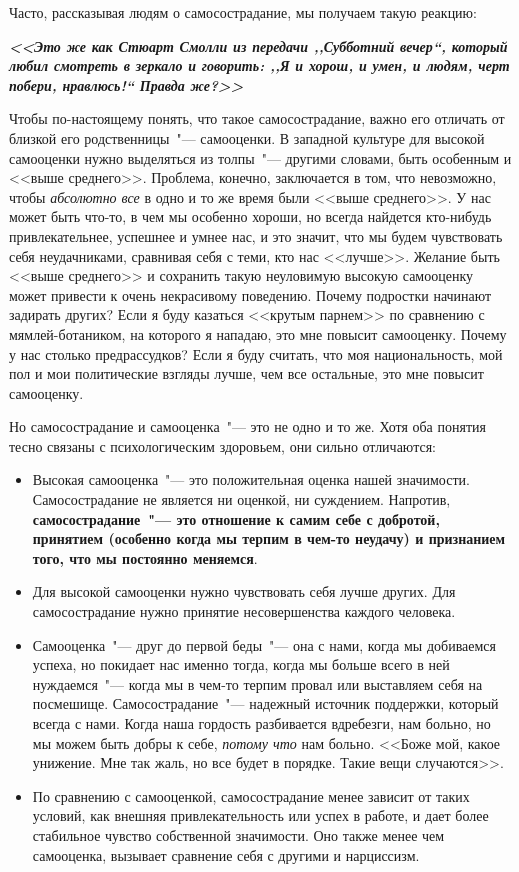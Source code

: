 Часто, рассказывая людям о самосострадание, мы получаем такую реакцию:

\textbf{\textit{<<Это же как Стюарт Смолли из передачи ,,Субботний вечер``, который любил смотреть в зеркало и говорить: ,,Я и хорош, и умен, и людям, черт побери, нравлюсь!`` Правда же?>> }}

\vspace{2ex}

Чтобы по-настоящему понять, что такое самосострадание, важно его отличать от близкой его родственницы~"--- самооценки. В западной культуре для высокой самооценки нужно выделяться из толпы~"--- другими словами, быть особенным и <<выше среднего>>. Проблема, конечно, заключается в том, что невозможно, чтобы \emph{абсолютно все} в одно и то же время были <<выше среднего>>. У нас может быть что-то, в чем мы особенно хороши, но всегда найдется кто-нибудь привлекательнее, успешнее и умнее нас, и это значит, что мы будем чувствовать себя неудачниками, сравнивая себя с теми, кто нас <<лучше>>. Желание быть <<выше среднего>> и сохранить такую неуловимую высокую самооценку может привести к очень некрасивому поведению. Почему подростки начинают  задирать других? Если я буду казаться <<крутым парнем>> по сравнению с мямлей-ботаником, на которого я нападаю, это мне повысит самооценку. Почему у нас столько предрассудков? Если я буду считать, что моя национальность, мой пол и мои политические взгляды лучше, чем все остальные, это мне повысит самооценку.
   
Но самосострадание и самооценка~"--- это не одно и то же. Хотя оба понятия тесно связаны с психологическим здоровьем, они сильно отличаются:

\begin{itemize}
	\item Высокая самооценка~"--- это положительная оценка нашей значимости. Самосострадание не является ни оценкой, ни суждением. Напротив, \textbf{самосострадание~"--- это отношение к самим себе с добротой, принятием (особенно когда мы терпим в чем-то неудачу) и признанием того, что мы постоянно меняемся}.
	\item Для высокой самооценки нужно чувствовать себя лучше других. Для самосострадание нужно принятие несовершенства каждого человека.
	\item Самооценка~"--- друг до первой беды~"--- она с нами, когда мы добиваемся успеха, но покидает нас именно тогда, когда мы больше всего в ней нуждаемся~"--- когда мы в чем-то терпим провал или выставляем себя на посмешище. Самосострадание~"--- надежный источник поддержки, который всегда с нами. Когда наша гордость разбивается вдребезги, нам больно, но мы можем быть добры к себе, \emph{потому что} нам больно. <<Боже мой, какое унижение. Мне так жаль, но все будет в порядке. Такие вещи случаются>>.
	\item По сравнению с самооценкой, самосострадание менее зависит от таких условий, как внешняя привлекательность или успех в работе, и дает более стабильное чувство собственной значимости. Оно также менее чем самооценка, вызывает сравнение себя с другими и нарциссизм.
\end{itemize}

